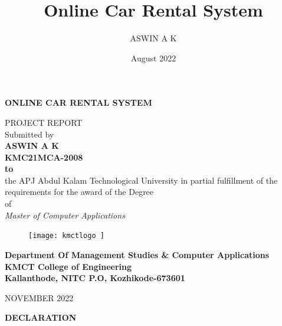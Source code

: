\documentclass[a4paper,12pt,toc=flat]{report}
\title{Online Car Rental System}
\author{ASWIN A K}
\date{August 2022}
\begin{document}
 
	{\centering \bf \large
		 ONLINE CAR RENTAL SYSTEM\par
	}
	\begin{center}
		{\small PROJECT REPORT} \vspace*{17pt}
		\\ Submitted by\\
		\vspace*{17pt}
		{\bf ASWIN A K \\
			KMC21MCA-2008\\
			\vspace*{23pt}
			to}\\
		\vspace*{15pt}
		the APJ Abdul Kalam Technological University in partial fulfillment of
		the requirements for the award of the Degree\\
		\vspace*{9pt} of\\
		\vspace*{9pt} \textit{ Master of Computer Applications
		} 
		\vspace*{15pt}
		\begin{figure}[bph]
			\centering
			\texttt{[image: kmctlogo ]}
			
			\label{fig:kmctlogo}
		\end{figure}
		
		\bf{Department Of Management Studies  \& Computer Applications
			\vspace*{12pt}
			\\KMCT College of Engineering
			\vspace*{8pt}
			\\Kallanthode, NITC P.O, Kozhikode-673601}
		
	\end{center}
	\begin{center}
		\vspace*{6pt}NOVEMBER 2022
	\end{center}
	
	\thispagestyle{empty}
	\clearpage
	\pagebreak
	
	{\centering \bf \large
		DECLARATION\par
	}
	
\end{document}
